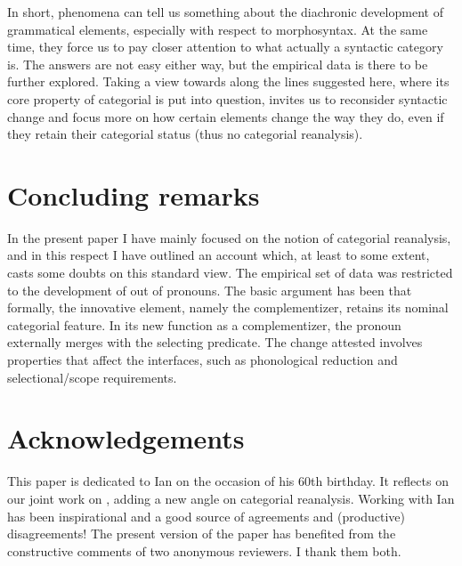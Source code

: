 \documentclass[output=paper]{langsci/langscibook}
\begin{document}
In short,  phenomena can tell us something about the
diachronic development of grammatical elements, especially with respect to
morphosyntax. At the same time, they force us to pay closer attention to what
actually a syntactic category is. The answers are not easy either way, but the
empirical data is there to be further explored. Taking a view towards
 along the lines suggested here, where its core property of
categorial  is put into question, invites us to reconsider syntactic
change and focus more on how certain elements change the way they do, even if
they retain their categorial status (thus no categorial reanalysis).

\section{Concluding remarks}\label{sec:21-conclusions}

In the present paper I have mainly focused on the notion of categorial
reanalysis, and in this respect I have outlined an account which, at least to
some extent, casts some doubts on this standard view. The empirical set of data
was restricted to the development of  out of pronouns. The
basic argument has been that formally, the innovative element, namely the
complementizer, retains its nominal categorial
feature. In its new function as a complementizer, the
pronoun externally merges with the selecting predicate.  The change attested
involves properties that affect the interfaces, such as phonological reduction
and selectional/scope requirements.

\label{sec:abbreviations}

\printchapterglossary{}

\section*{Acknowledgements}

This paper is dedicated to Ian on the occasion of his 60th birthday. It
reflects on our joint work on , adding a new angle on
categorial reanalysis. Working with Ian has been inspirational and a good
source of agreements and (productive) disagreements! The present version of the
paper has benefited from the constructive comments of two anonymous reviewers.
I thank them both.

{\sloppy
\printbibliography[heading=subbibliography,notkeyword=this]
}
\end{document}

